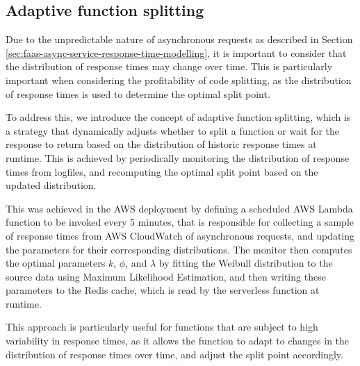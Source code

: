 \subsection{Adaptive function splitting}
\label{sec:faaas-adaptive-function-splitting}
Due to the unpredictable nature of asynchronous requests as described in Section \ref{sec:faas-async-service-response-time-modelling}, it is important to consider that the distribution of response times may change over time. This is particularly important when considering the profitability of code splitting, as the distribution of response times is used to determine the optimal split point.

To address this, we introduce the concept of adaptive function splitting, which is a strategy that dynamically adjusts whether to split a function or wait for the response to return based on the distribution of historic response times at runtime. This is achieved by periodically monitoring the distribution of response times from logfiles, and recomputing the optimal split point based on the updated distribution.

This was achieved in the AWS deployment by defining a scheduled AWS Lambda function to be invoked every 5 minutes, that is responsible for collecting a sample of response times from AWS CloudWatch of asynchronous requests, and updating the parameters for their corresponding distributions. The monitor then computes the optimal parameters $k$, $\phi$, and $\lambda$ by fitting the Weibull distribution to the source data using Maximum Likelihood Estimation, and then writing these parameters to the Redis cache, which is read by the serverless function at runtime.

This approach is particularly useful for functions that are subject to high variability in response times, as it allows the function to adapt to changes in the distribution of response times over time, and adjust the split point accordingly.
